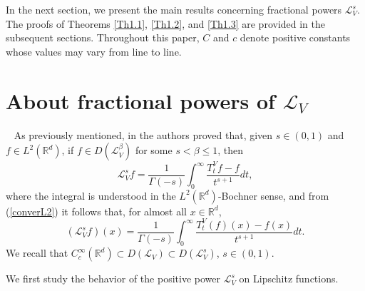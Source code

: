\documentclass[10pt, a4paper, reqno]{amsart}
\theoremstyle{definition}
\theoremstyle{remark}
\numberwithin{equation}{section}
\begin{document}
In the next section, we present the main results concerning fractional powers $\mathcal{L}_V^s$. The proofs of Theorems \ref{Th1.1}, \ref{Th1.2}, and \ref{Th1.3} are provided in the subsequent sections. Throughout this paper, $C$ and $c$ denote positive constants whose values may vary from line to line. 

\section{About fractional powers of \texorpdfstring{$\mathcal{L}_V$}{LV}}~\label{sec: 2}
As previously mentioned, in \cite[Proposition 2.4]{BDFQ} the authors proved that, given $s\in (0,1)$ and $f\in L^2(\mathbb R^d)$, if $f\in D(\mathcal L_V^\beta)$ for some $s<\beta \leq 1$, then
\begin{equation}\label{converL2}
\mathcal L_V^sf=\frac{1}{\Gamma (-s)}\int_0^\infty \frac{T_t^Vf-f}{t^{s+1}}dt,
\end{equation}
where the integral is understood in the $L^2(\mathbb R^d)$-Bochner sense, and from (\ref{converL2}) it follows that, for almost all $x\in \mathbb{R}^d$,
\[
(\mathcal{L}_V^sf)(x)=\frac{1}{\Gamma(-s)}\int_0^\infty\frac{T_t^V(f)(x)-f(x)}{t^{s+1}}dt.
\]
We recall that $C_c^\infty(\mathbb{R}^d)\subset D(\mathcal{L}_V)\subset D(\mathcal{L}_V^s)$, $s\in (0,1)$.

We first study the behavior of the positive power $\mathcal{L}_V^s$ on Lipschitz functions.
\end{document}
